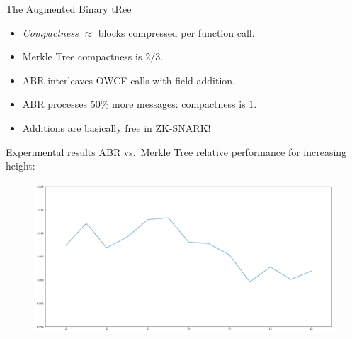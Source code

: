 \documentclass[beamer={10pt,xcolor=dvipsnames},target=mst]{thud}
\begin{document}
\begin{frame}[noframenumbering]{The Augmented Binary tRee~\cite{AndreevaBR2021}}
\begin{figure}
{\begin{tikzpicture}[node distance={32pt}, node/.style = {draw, circle},on grid=true]
        
 
      \end{tikzpicture}
    }
  \end{figure}

  \begin{itemize}
    \item \emph{Compactness} \(\approx \) blocks compressed per function call.
    \item Merkle Tree compactness is \(2/3\). 
    \item ABR interleaves OWCF calls with field addition.
    \item ABR processes 50\% more messages: compactness is \(1\).
    \item Additions are basically free in ZK-SNARK\@!
  \end{itemize}
\end{frame}

\begin{frame}[noframenumbering]{Experimental results}
  ABR vs.\ Merkle Tree relative performance for increasing height:
  \begin{figure}
    \centering
    \includegraphics[scale=0.25]{res/abr_vs_mtree.png}
  \end{figure}
\end{frame}

\begin{frame}
  
  
\end{frame}
\end{document}
